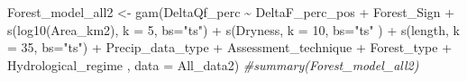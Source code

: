 \documentclass[]{elsarticle} %
\newenvironment{Shaded}{\begin{snugshade}}{\end{snugshade}}
\newcommand{\AttributeTok}[1]{\textcolor[rgb]{0.77,0.63,0.00}{#1}}
\newcommand{\CommentTok}[1]{\textcolor[rgb]{0.56,0.35,0.01}{\textit{#1}}}
\newcommand{\DecValTok}[1]{\textcolor[rgb]{0.00,0.00,0.81}{#1}}
\newcommand{\FunctionTok}[1]{\textcolor[rgb]{0.00,0.00,0.00}{#1}}
\newcommand{\NormalTok}[1]{#1}
\newcommand{\OtherTok}[1]{\textcolor[rgb]{0.56,0.35,0.01}{#1}}
\newcommand{\SpecialCharTok}[1]{\textcolor[rgb]{0.00,0.00,0.00}{#1}}
\newcommand{\StringTok}[1]{\textcolor[rgb]{0.31,0.60,0.02}{#1}}
\begin{document}
\begin{Shaded}
\begin{Highlighting}[]
\NormalTok{Forest\_model\_all2 }\OtherTok{\textless{}{-}} \FunctionTok{gam}\NormalTok{(DeltaQf\_perc }\SpecialCharTok{\textasciitilde{}}\NormalTok{ DeltaF\_perc\_pos }\SpecialCharTok{+}\NormalTok{ Forest\_Sign }\SpecialCharTok{+} 
                    \FunctionTok{s}\NormalTok{(}\FunctionTok{log10}\NormalTok{(Area\_km2), }\AttributeTok{k =} \DecValTok{5}\NormalTok{, }\AttributeTok{bs=}\StringTok{"ts"}\NormalTok{) }\SpecialCharTok{+} 
                    \FunctionTok{s}\NormalTok{(Dryness, }\AttributeTok{k =} \DecValTok{10}\NormalTok{, }\AttributeTok{bs=}\StringTok{"ts"}\NormalTok{ ) }\SpecialCharTok{+} 
                     \FunctionTok{s}\NormalTok{(length, }\AttributeTok{k =} \DecValTok{35}\NormalTok{, }\AttributeTok{bs=}\StringTok{"ts"}\NormalTok{) }\SpecialCharTok{+}
\NormalTok{                    Precip\_data\_type }\SpecialCharTok{+}\NormalTok{  Assessment\_technique }\SpecialCharTok{+}
\NormalTok{                    Forest\_type }\SpecialCharTok{+}
\NormalTok{                    Hydrological\_regime}
\NormalTok{                    , }\AttributeTok{data =}\NormalTok{ All\_data2)}
\CommentTok{\#summary(Forest\_model\_all2)}
\end{Highlighting}
\end{Shaded}
\end{document}

